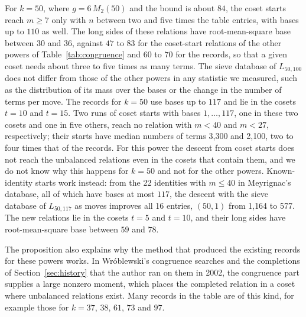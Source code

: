 \documentclass[11pt]{amsart}
\theoremstyle{definition}
\theoremstyle{remark}
\begin{document}
For $k=50$, where $g=6\,M_2(50)$ and the bound is about $84$, the coset starts reach $m\ge7$
only with $n$ between two and five times the table entries, with bases up to $110$ as well. The
long sides of these relations have root-mean-square base between $30$ and $36$, against $47$ to
$83$ for the coset-start relations of the other powers of Table~\ref{tab:congruence} and $60$ to
$70$ for the records, so that a given coset needs about three to five times as many terms. The
sieve database of $L_{50,100}$ does not differ from those of the other powers in any statistic we
measured, such as the distribution of its mass over the bases or the change in the number of
terms per move. The records for $k=50$ use bases up to $117$ and lie in the cosets $t=10$ and
$t=15$. Two runs of coset starts with bases $1,\dots,117$, one in these two cosets and one in
five others, reach no relation with $m<40$ and $m<27$, respectively; their starts have median
numbers of terms 3,300 and 2,100, two to four times that of the records. For this power the
descent from coset starts does not reach the unbalanced relations even in the cosets that
contain them, and we do not know why this happens for $k=50$ and not for the other powers. Known-identity
starts work instead: from the 22 identities with $m\le40$ in Meyrignac's database, all of which
have bases at most $117$, the descent with the sieve database of $L_{50,117}$ as moves improves
all 16 entries, $(50,1)$ from 1{,}164 to 577. The new relations lie in the cosets $t=5$ and
$t=10$, and their long sides have root-mean-square base between $59$ and $78$.

\begin{table}[htbp]
\centering\scriptsize
\setlength{\tabcolsep}{4pt}

\caption{Powers $33\le k\le100$ whose short relations have a forced moment: the degree $j$, the
primes in $M_j(k)$, the fraction of the rows of a BKZ-20 basis of $L_{k,100}$ on which $\mu_j$
vanishes, and the entries ($m\le16$) improved by the plain search with bases $1,\dots,100$
(``plain'') and by all methods (``all''), including the coset and known-identity starts of
Section~\ref{sec:congruence} and the completions of Sections~\ref{sec:completion}
and~\ref{sec:structured}.}\label{tab:congruence}
\end{table}

The proposition also explains why the method that produced the existing records for these
powers works. In Wr\'oblewski's congruence searches and the completions of
Section~\ref{sec:history} that the author ran on them in 2002, the congruence part supplies a
large nonzero moment, which places the completed relation in a coset where unbalanced relations
exist. Many records in the table are of this kind, for example those for $k=37$, $38$, $61$,
$73$ and $97$.
\end{document}
